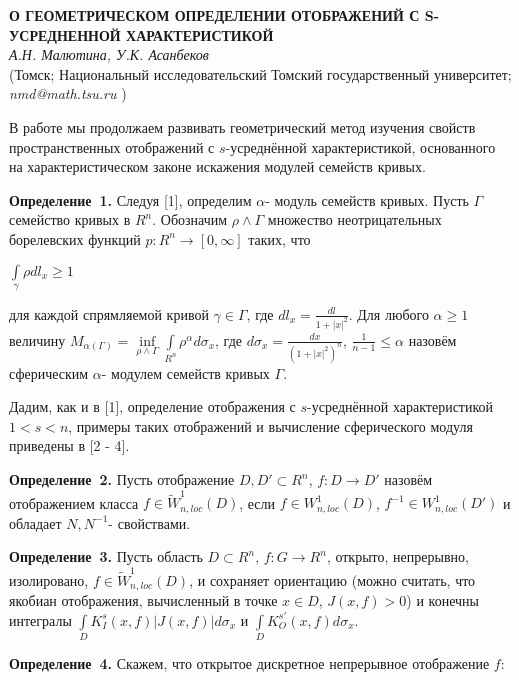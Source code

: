 \begin{center}{ \bf  О ГЕОМЕТРИЧЕСКОМ ОПРЕДЕЛЕНИИ ОТОБРАЖЕНИЙ С S- УСРЕДНЕННОЙ ХАРАКТЕРИСТИКОЙ}\\
{\it А.Н. Малютина, У.К. Асанбеков } \\
(Томск; Национальный исследовательский Томский государственный университет; {\it nmd@math.tsu.ru} )
\end{center}


В работе мы продолжаем развивать геометрический метод изучения свойств пространственных отображений с $s$-усреднённой характеристикой, основанного на характеристическом законе искажения модулей семейств кривых.

\textbf{Определение~1.} Следуя [1], определим $\alpha$- модуль семейств кривых. Пусть $\Gamma$ семейство кривых в $R^{n}$. Обозначим $\rho\wedge\Gamma$ множество неотрицательных борелевских функций $p:R^{n}\rightarrow[0,\infty]$ таких, что
\begin{center}
	$\int\limits_{\gamma}\rho dl_{x}\geqslant1$
\end{center}

для каждой спрямляемой кривой $\gamma\in\Gamma$, где $dl_{x}=\frac{dl}{1+|x|^{2}}$. Для любого $\alpha\geqslant1$ величину	 $M_{\alpha(\Gamma)}=\inf\limits_{\rho\wedge\Gamma}\int\limits_{R^{n}}\rho^{\alpha}d\sigma_{x}$, где $d\sigma_{x}=\frac{dx}{(1+|x|^{2})^{n}}$, $\frac{1}{n-1}\leqslant\alpha$ назовём сферическим $\alpha$- модулем семейств кривых $\Gamma$.


Дадим, как и в [1], определение отображения с $s$-усреднённой характеристикой $1<s<n$, примеры таких отображений и вычисление сферического модуля приведены в [2 - 4].

\textbf{Определение~2.} Пусть отображение $D, D'\subset R^{n}$, $f:D\rightarrow D'$ назовём отображением класса $f\in\tilde{W}^{1}_{n,loc}(D)$, если $f\in W^{1}_{n,loc}(D)$, $f^{-1}\in W^{1}_{n,loc}(D')$ и обладает $N,N^{-1}$- свойствами.


\textbf{Определение~3.} Пусть область $D\subset R^{n}$, $f:G\rightarrow R^{n}$, открыто, непрерывно, изолировано, $f\in\tilde{W}^{1}_{n,loc}(D)$, и сохраняет ориентацию (можно считать, что якобиан отображения, вычисленный в точке $x\in D$, $J(x,f)>0$) и конечны интегралы $\int\limits_{D}K_{I}^{s}(x,f)|J(x,f)|d\sigma_{x}$ и $\int\limits_{D}K_{O}^{s'}(x,f)d\sigma_{x}$.


\textbf{Определение~4.} Скажем, что открытое дискретное непрерывное отображение $f$:


